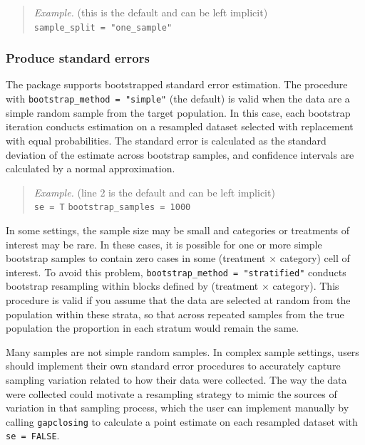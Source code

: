 \documentclass[
]{article}
\begin{document}
\begin{quote}
\emph{Example.} (this is the default and can be left implicit)\\
\texttt{sample\_split\ =\ "one\_sample"}
\end{quote}

\subsubsection{Produce standard errors}\label{produce-standard-errors}

The package supports bootstrapped standard error estimation. The procedure with \texttt{bootstrap\_method\ =\ "simple"} (the default) is valid when the data are a simple random sample from the target population. In this case, each bootstrap iteration conducts estimation on a resampled dataset selected with replacement with equal probabilities. The standard error is calculated as the standard deviation of the estimate across bootstrap samples, and confidence intervals are calculated by a normal approximation.

\begin{quote}
\emph{Example.} (line 2 is the default and can be left implicit)\\
\texttt{se\ =\ T}
\texttt{bootstrap\_samples\ =\ 1000}
\end{quote}

In some settings, the sample size may be small and categories or treatments of interest may be rare. In these cases, it is possible for one or more simple bootstrap samples to contain zero cases in some (treatment \(\times\) category) cell of interest. To avoid this problem, \texttt{bootstrap\_method\ =\ "stratified"} conducts bootstrap resampling within blocks defined by (treatment \(\times\) category). This procedure is valid if you assume that the data are selected at random from the population within these strata, so that across repeated samples from the true population the proportion in each stratum would remain the same.

Many samples are not simple random samples. In complex sample settings, users should implement their own standard error procedures to accurately capture sampling variation related to how their data were collected. The way the data were collected could motivate a resampling strategy to mimic the sources of variation in that sampling process, which the user can implement manually by calling \texttt{gapclosing} to calculate a point estimate on each resampled dataset with \texttt{se\ =\ FALSE}.
\end{document}
